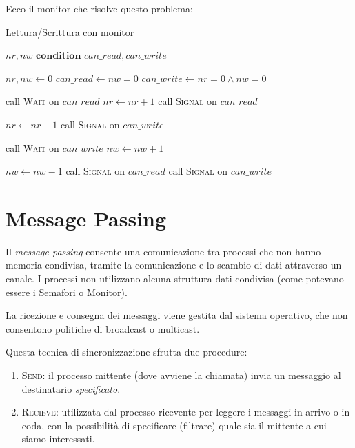 \documentclass{article}
\begin{document}
Ecco il monitor che risolve questo problema:

\begin{algorithm}[H]
  \caption{Lettura/Scrittura con monitor}
  \begin{algorithmic}[0]
    \State $nr, nw$
    \State $\textbf{condition } can\_read, can\_write$

    \State
      \State $nr, nw \gets 0$
      \State $can\_read \gets nw = 0$
      \State $can\_write \gets nr = 0 \wedge nw = 0$
    \EndProcedure

        \State call \textsc{Wait} on $can\_read$
      \EndIf
      \State $nr \gets nr + 1$
      \State call \textsc{Signal} on $can\_read$
    \EndProcedureEntry

      \State $nr \gets nr - 1$
        \State call \textsc{Signal} on $can\_write$
      \EndIf
    \EndProcedureEntry

        \State call \textsc{Wait} on $can\_write$
      \EndIf
      \State $nw \gets nw + 1$
    \EndProcedureEntry

      \State $nw \gets nw - 1$
      \State call \textsc{Signal} on $can\_read$
        \State call \textsc{Signal} on $can\_write$
      \EndIf
    \EndProcedureEntry
    \EndMonitor
  \end{algorithmic}
\end{algorithm}

\section{Message Passing}

Il \emph{message passing} consente una comunicazione tra processi che non hanno memoria
condivisa, tramite la comunicazione e lo scambio di dati attraverso un canale.
I processi non utilizzano alcuna struttura dati condivisa (come potevano essere
i Semafori o Monitor).

La ricezione e consegna dei messaggi viene gestita dal sistema operativo, che
non consentono politiche di broadcast o multicast.

Questa tecnica di sincronizzazione sfrutta due procedure:
\begin{enumerate}
  \item \textsc{Send}: il processo mittente (dove avviene la chiamata) invia
    un messaggio al destinatario \emph{specificato}.
  \item \textsc{Recieve}: utilizzata dal processo ricevente per leggere i
    messaggi in arrivo o in coda, con la possibilit\`a di specificare (filtrare)
    quale sia il mittente a cui siamo interessati.
\end{enumerate}
\end{document}
